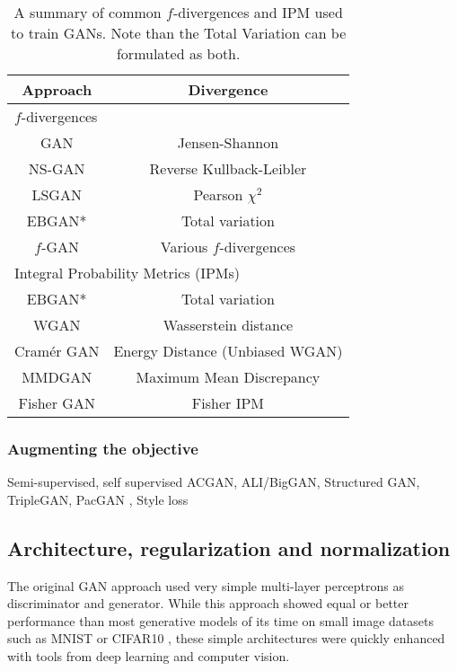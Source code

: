 \begin{table}
	\centering
	\begin{tabular}{|c c|}
		\hline
		Approach & Divergence \\
		\hline 
		\hline 
		\multicolumn{2}{|l|}{$f$-divergences} \\
		\hline
		GAN \citep{Goodfellow2014}& Jensen-Shannon \\
		NS-GAN \citep{Goodfellow2014} & Reverse Kullback-Leibler \\
		LSGAN \citep{Mao2017}& Pearson $\chi^2$ \\
		EBGAN* \citep{Zhao2017} & Total variation \\
		$f$-GAN \citep{Nowozin2016} & Various $f$-divergences\\
		\hline 
		\hline 
		\multicolumn{2}{|l|}{Integral Probability Metrics (\ac{IPM}s)}\\
		\hline
		EBGAN* \citep{Zhao2017} & Total variation \\
		WGAN \citep{Arjovsky2017}& Wasserstein distance \\
		Cramér GAN \citep{Bellemare2017}& Energy Distance (Unbiased WGAN) \\
		MMDGAN \citep{Li2017a}& Maximum Mean Discrepancy \\				
		Fisher GAN\citep{Mroueh2017}& Fisher IPM \\
		\hline
	\end{tabular}
	\label{table:divergences}
	\caption[Summary of common $f$-divergences and \ac{IPM} used to train GANs]{A summary of common $f$-divergences and \ac{IPM} used to train GANs. Note than the Total Variation can be formulated as both.}
\end{table}


\subsubsection{Augmenting the objective}
\label{subs:augmented_objectives}

Semi-supervised, self supervised
ACGAN, ALI/BigGAN, Structured GAN, TripleGAN,  PacGAN , Style loss



\subsection{Architecture, regularization and normalization}

The original GAN approach \citep{Goodfellow2014} used very simple multi-layer perceptrons as discriminator and generator. While this approach showed equal or better performance than most generative models of its time \citep{Kingma2014b,Bengio2014} on small image datasets such as MNIST \citep{LeCun1998a} or CIFAR10 \citep{Krizhevsky2009}, these simple architectures were quickly enhanced with tools from deep learning and computer vision.

